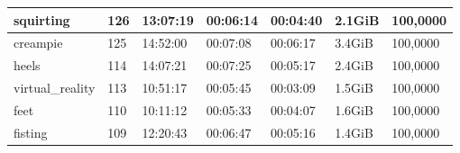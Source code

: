\begin{table}[]
\begin{tabular}{l|l|l|l|l|l|l}
squirting                                          & 126                                                 & 13:07:19                                                 & 00:06:14                                                & 00:04:40                                               & 2.1GiB                                               & 100,0000                                                      \\ \hline
creampie                                           & 125                                                 & 14:52:00                                                 & 00:07:08                                                & 00:06:17                                               & 3.4GiB                                               & 100,0000                                                      \\ \hline
heels                                              & 114                                                 & 14:07:21                                                 & 00:07:25                                                & 00:05:17                                               & 2.4GiB                                               & 100,0000                                                      \\ \hline
virtual\_reality                                   & 113                                                 & 10:51:17                                                 & 00:05:45                                                & 00:03:09                                               & 1.5GiB                                               & 100,0000                                                      \\ \hline
feet                                               & 110                                                 & 10:11:12                                                 & 00:05:33                                                & 00:04:07                                               & 1.6GiB                                               & 100,0000                                                      \\ \hline
fisting                                            & 109                                                 & 12:20:43                                                 & 00:06:47                                                & 00:05:16                                               & 1.4GiB                                               & 100,0000                                                      \\ \hline

\end{tabular}
\end{table}
